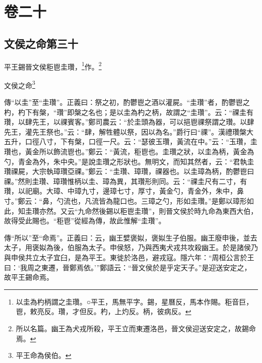 

\chapter{卷二十}


\section{文侯之命第三十}


平王錫晉文侯秬鬯圭瓚，\footnote{以圭為杓柄謂之圭瓚。○平王，馬無平字。錫，星曆反，馬本作賜。秬音巨，鬯，敕亮反。瓚，才但反。杓，上灼反。柄，彼病反。}作。\footnote{所以名篇。幽王為犬戎所殺，平王立而東遷洛邑，晉文侯迎送安定之，故錫命焉。}

文侯之命\footnote{平王命為侯伯。}

{\noindent\zhuan{}\fzbyks 傳“以圭”至“圭瓚”。正義曰：祭之初，酌鬱鬯之酒以灌屍。“圭瓚”者，酌鬱鬯之杓，杓下有槃，“瓚”即槃之名也；是以圭為杓之柄，故謂之“圭瓚”。云：“祼圭有瓚，以肆先王，以祼賓客。”鄭司農云：“於圭頭為器，可以挹鬯祼祭謂之瓚。以肆先王，灌先王祭也。”云：“肆，解牲體以祭，因以為名。”爵行曰“祼”。漢禮瓚槃大五升，口徑八寸，下有槃，口徑一尺。云：“瑟彼玉瓚，黃流在中。”云：“玉瓚，圭瓚也，黃金所以飾流鬯也。”鄭云：“黃流，秬鬯也。圭瓚之狀，以圭為柄，黃金為勺，青金為外，朱中央。”是說圭瓚之形狀也。無明文，而知其然者，云：“君執圭瓚祼屍，大宗執璋瓚亞祼。”鄭云：“圭瓚、璋瓚，祼器也。以圭璋為柄，酌鬱鬯曰祼。”然則圭瓚、璋瓚惟柄以圭、璋為異，其瓚形則同。云：“祼圭尺有二寸，有瓚，以祀廟。大璋、中璋九寸，邊璋七寸，厚寸，黃金勺，青金外，朱中，鼻寸。”鄭云：“鼻，勺流也，凡流皆為龍口也。三璋之勺，形如圭瓚。”是鄭以璋形如此，知圭瓚亦然。又云“九命然後錫以秬鬯圭瓚”，則晉文侯於時九命為東西大伯，故得受此賜也。“秬鬯”從經為傳，故此惟解“圭瓚”。 \par}

{\noindent\zhuan{}\fzbyks 傳“所以”至“命焉”。正義曰：云，幽王嬖褒姒，褒姒生子伯服。幽王廢申後，並去太子，用褒姒為後，伯服為太子。申侯怒，乃與西夷犬戎共攻殺幽王。於是諸侯乃與申侯共立太子宜臼，是為平王。東徙於洛邑，避戎寇。隱六年：“周桓公言於王曰：‘我周之東遷，晉鄭焉依。’”鄭語云：“晉文侯於是乎定天子。”是迎送安定之，故平王錫命焉。 \par}

